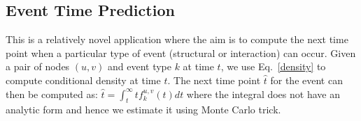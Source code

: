 \documentclass[11pt]{article}
\newcommand{\RT}[1]{{\color{blue} [Rakshit: #1]}}
\begin{document}
\subsection{Event Time Prediction}
This is a relatively novel application where the aim is to compute the next time point when a particular type of event (structural or interaction) can occur. Given a pair of nodes $(u, v)$ and event type $k$ at time $t$, we use Eq.~\ref{density} to compute conditional density at time $t$. The next time point $\hat{t}$ for the event can then be computed as:
$
\hat{t} = \int_{t}^\infty tf^{u,v}_k(t)dt
$
where the integral does not have an analytic form and hence we estimate it using Monte Carlo trick.
\end{document}
